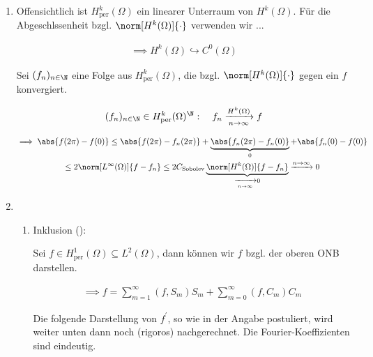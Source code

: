 \begin{solution}

\phantom{}


\begin{enumerate}[label = (\roman*)]

  \item Offensichtlich ist $H_\mathrm{per}^k(\Omega)$ ein linearer Unterraum von $H^k(\Omega)$.
  Für die Abgeschlssenheit bzgl. $\norm[H^k(\Omega)]{\cdot}$ verwenden wir ...


  \begin{align*}
    \implies
    H^k(\Omega) \hookrightarrow C^0(\Omega)
  \end{align*}

  Sei $(f_n)_{n \in \N}$ eine Folge aus $H_\mathrm{per}^k(\Omega)$, die bzgl. $\norm[H^k(\Omega)]{\cdot}$ gegen ein $f$ konvergiert.

  \begin{align*}
    (f_n)_{n \in \N} \in H_\mathrm{per}^k(\Omega)^\N:
    \quad
    f_n \xrightarrow[n \to \infty]{H^k(\Omega)} f
  \end{align*}

  \begin{multline*}
    \implies
    \abs{f(2 \pi) - f(0)}
    \leq
    \abs{f(2 \pi) - f_n(2 \pi)} + \underbrace{\abs{f_n(2 \pi) - f_n(0)}}_0 + \abs{f_n(0) - f(0)} \\
    \leq
    2 \norm[L^\infty(\Omega)]{f - f_n}
    \leq
    2 C_\mathrm{Sobolev} \underbrace{\norm[H^k(\Omega)]{f - f_n}}_{\xrightarrow[n \to \infty]{} 0}
    \xrightarrow[]{n \to \infty}
    0
  \end{multline*}

  \item

  \begin{enumerate}

    \item Inklusion (\Quote{$\subseteq$}):

    Sei $f \in H_\mathrm{per}^1(\Omega) \subseteq L^2(\Omega)$, dann können wir $f$ bzgl. der oberen ONB darstellen.

    \begin{align*}
      \implies
      f
      =
      \sum_{m=1}^\infty (f, S_m) S_m + \sum_{m=0}^\infty (f, C_m) C_m
    \end{align*}

    Die folgende Darstellung von $f^\prime$, so wie in der Angabe postuliert, wird weiter unten dann noch (rigoros) nachgerechnet.
    Die Fourier-Koeffizienten sind eindeutig.


\end{enumerate}
\end{enumerate}
\end{solution}

